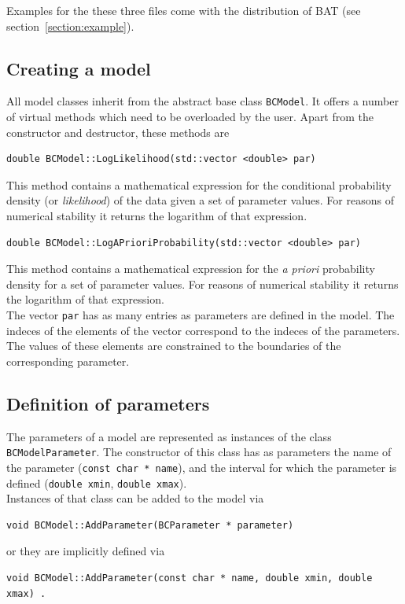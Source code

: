 \documentclass[11pt, a4paper]{article}
\begin{document}
\noindent
Examples for the these three files come with the distribution of {\sc
BAT} (see section~\ref{section:example}).

\subsection{Creating a model}

All model classes inherit from the abstract base class
\verb|BCModel|. It offers a number of virtual methods which need to be
overloaded by the user. Apart from the constructor and destructor,
these methods are
%
\begin{verbatim}
double BCModel::LogLikelihood(std::vector <double> par)
\end{verbatim}

\noindent
This method contains a mathematical expression for the conditional
probability density (or {\it likelihood}) of the data given a set of
parameter values. For reasons of numerical stability it returns the
logarithm of that expression. \\

\begin{verbatim}
double BCModel::LogAPrioriProbability(std::vector <double> par)
\end{verbatim}
%
\noindent
This method contains a mathematical expression for the {\it a priori}
probability density for a set of parameter values. For reasons of
numerical stability it returns the logarithm of that expression. \\

\noindent
The vector \verb|par| has as many entries as parameters are defined in
the model. The indeces of the elements of the vector correspond to the
indeces of the parameters. The values of these elements are
constrained to the boundaries of the corresponding parameter.

\subsection{Definition of parameters}

The parameters of a model are represented as instances of the class
\verb|BCModelParameter|. The constructor of this class has as
parameters the name of the parameter (\verb|const char * name|), and
the interval for which the parameter is defined (\verb|double xmin|,
\verb|double xmax|). \\ 

Instances of that class can be added to the model via 
%
\begin{verbatim}
void BCModel::AddParameter(BCParameter * parameter) 
\end{verbatim}
%
\noindent 
or they are implicitly defined via 
%
\begin{verbatim}
void BCModel::AddParameter(const char * name, double xmin, double xmax) . 
\end{verbatim}
\end{document}
